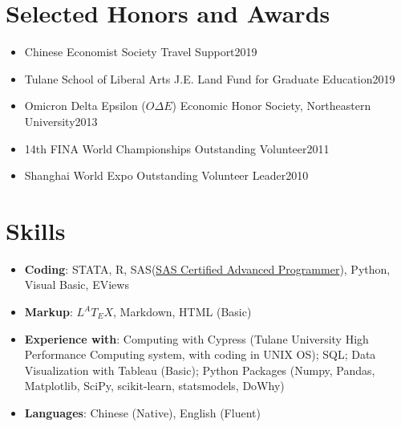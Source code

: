 \documentclass{resume}
\begin{document}

\section{Selected Honors and Awards}
\begin{itemize}[parsep=0.25ex]
  \item Chinese Economist Society Travel Support\hfill 2019
  \item Tulane School of Liberal Arts J.E. Land Fund for Graduate Education\hfill 2019
  \item Omicron Delta Epsilon ($O\Delta E$) Economic Honor Society, Northeastern University\hfill 2013
  \item 14th FINA World Championships Outstanding Volunteer\hfill 2011
  \item Shanghai World Expo Outstanding Volunteer Leader\hfill 2010
\end{itemize}

\section{Skills}
\begin{itemize}[parsep=0.25ex]
  \item \textbf{Coding}:
    STATA, R, SAS(\href{https://www.youracclaim.com/badges/c4bce10e-7398-4203-9d11-f9c6723749a4/linked_in_profile}{SAS Certified Advanced Programmer}), Python, Visual Basic, EViews
    
  \item \textbf{Markup}:
    $L^{A}T_{E}X$, Markdown, HTML (Basic)

  \item \textbf{Experience with}:
   Computing with Cypress (Tulane University High Performance Computing system, with coding in UNIX OS); SQL; Data Visualization with Tableau (Basic); Python Packages (Numpy, Pandas, Matplotlib, SciPy, scikit-learn, statsmodels, DoWhy)


 \item \textbf{Languages}: 
  Chinese (Native), English (Fluent)  
\end{itemize}
\end{document}

